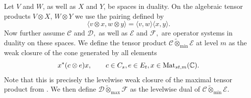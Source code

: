 \documentclass[11pt,onecolumn]{article}
\theoremstyle{plain}
\newtheorem{lemma}[lemma]{Lemma}
\theoremstyle{definition}
\newcommand{\C}{\mathbb{C}}
\begin{document}
Let $V$ and $W$, as well as $X$ and $Y$, be spaces in duality.  On the algebraic
tensor products $V\otimes X$, $W\otimes Y$ we use the pairing defined by
\[
    \langle v\otimes x,w\otimes y\rangle
    =\langle v,w\rangle\langle x,y\rangle.
\]
Now further assume $\mathcal C$ and $\mathcal D,$ as well as $\mathcal E$ and $\mathcal F,$ are operator systems in duality on these spaces. We define the tensor product $\mathcal C\tilde\otimes_{\min}\mathcal E$ at level $m$ 
as the weak closure of the cone generated by all elements
\[
  x^*(c\otimes e)x, \qquad c\in C_s, e\in E_t, x\in{\rm Mat}_{st,m}(\C).
\]
Note that this is precisely the levelwise weak closure of the maximal tensor product from \cite{KavrukPaulsenTodorovTomforde2011}.
We then define  $\mathcal D\tilde\otimes_{\max}\mathcal F$ as the levelwise dual of $\mathcal C\tilde\otimes_{\min}\mathcal E.$ 
\end{document}
